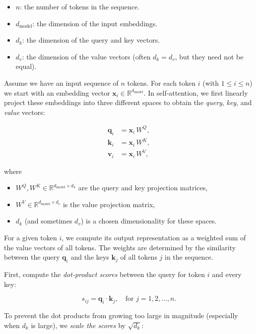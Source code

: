 \begin{itemize}
	\item \( n \): the number of tokens in the sequence.
	\item \( d_{\text{model}} \): the dimension of the input embeddings.
	\item \( d_k \): the dimension of the query and key vectors.
	\item \( d_v \): the dimension of the value vectors (often \( d_k = d_v \), but they need not be equal).
\end{itemize}

Assume we have an input sequence of \( n \) tokens. For each token \( i \) (with \( 1 \leq i \leq n \)) we start with an embedding vector \( \mathbf{x}_i \in \mathbb{R}^{d_{\text{model}}} \). In self‐attention, we first linearly project these embeddings into three different spaces to obtain the \textit{query}, \textit{key}, and \textit{value} vectors:

\[
\begin{aligned}
\mathbf{q}_i &= \mathbf{x}_i \, W^Q, \\
\mathbf{k}_i &= \mathbf{x}_i \, W^K, \\
\mathbf{v}_i &= \mathbf{x}_i \, W^V,
\end{aligned}
\]

where
\begin{itemize}
	\item \( W^Q, W^K \in \mathbb{R}^{d_{\text{model}} \times d_k} \) are the query and key projection matrices,
	\item \( W^V \in \mathbb{R}^{d_{\text{model}} \times d_v} \) is the value projection matrix,
	\item \( d_k \) (and sometimes \( d_v \)) is a chosen dimensionality for these spaces.
\end{itemize}

For a given token \( i \), we compute its output representation as a weighted sum of the value vectors of all tokens. The weights are determined by the similarity between the query \( \mathbf{q}_i \) and the keys \( \mathbf{k}_j \) of all tokens \( j \) in the sequence.

First, compute the \textit{dot-product scores} between the query for token \( i \) and every key:

\[
s_{ij} = \mathbf{q}_i \cdot \mathbf{k}_j, \quad \text{for } j = 1, 2, \dots, n.
\]

To prevent the dot products from growing too large in magnitude (especially when \( d_k \) is large), we \textit{scale the scores} by \( \sqrt{d_k} \):

